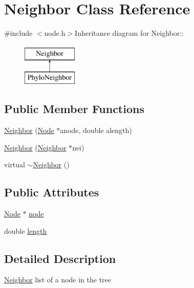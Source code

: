 \hypertarget{classNeighbor}{
\section{Neighbor Class Reference}
\label{classNeighbor}
}


{\ttfamily \#include $<$node.h$>$}Inheritance diagram for Neighbor::\begin{figure}[H]
\begin{center}
\leavevmode
\includegraphics[height=2cm]{classNeighbor}
\end{center}
\end{figure}
\subsection*{Public Member Functions}
\begin{DoxyCompactItemize}
\item 
\hyperlink{classNeighbor_a5fce1b4b3ca5dc76bb7ba042b76786cb}{Neighbor} (\hyperlink{classNode}{Node} $\ast$anode, double alength)
\item 
\hyperlink{classNeighbor_aa93ef5611e62a5249e743465df3845ad}{Neighbor} (\hyperlink{classNeighbor}{Neighbor} $\ast$nei)
\item 
virtual \hyperlink{classNeighbor_a5dc94080d5904a504dfe3bcc7e9e14bb}{$\sim$Neighbor} ()
\end{DoxyCompactItemize}
\subsection*{Public Attributes}
\begin{DoxyCompactItemize}
\item 
\hyperlink{classNode}{Node} $\ast$ \hyperlink{classNeighbor_aa3e869eea994f6aa07708d3f326e01cb}{node}
\item 
double \hyperlink{classNeighbor_af6ad6ad901efea8b73bca889e2a0a501}{length}
\end{DoxyCompactItemize}


\subsection{Detailed Description}
\hyperlink{classNeighbor}{Neighbor} list of a node in the tree 


